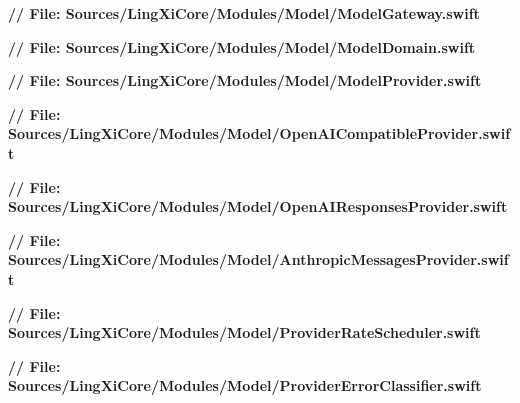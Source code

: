 \documentclass[10pt,a4paper]{article}
\newcommand{\repoRoot}{../../../}
\begin{document}
\noindent\textbf{// File: Sources/LingXiCore/Modules/Model/ModelGateway.swift}\par\vspace{2pt}

\vspace{8pt}

\noindent\textbf{// File: Sources/LingXiCore/Modules/Model/ModelDomain.swift}\par\vspace{2pt}

\vspace{8pt}

\noindent\textbf{// File: Sources/LingXiCore/Modules/Model/ModelProvider.swift}\par\vspace{2pt}

\vspace{8pt}

\noindent\textbf{// File: Sources/LingXiCore/Modules/Model/OpenAICompatibleProvider.swift}\par\vspace{2pt}

\vspace{8pt}

\noindent\textbf{// File: Sources/LingXiCore/Modules/Model/OpenAIResponsesProvider.swift}\par\vspace{2pt}

\vspace{8pt}

\noindent\textbf{// File: Sources/LingXiCore/Modules/Model/AnthropicMessagesProvider.swift}\par\vspace{2pt}

\vspace{8pt}

\noindent\textbf{// File: Sources/LingXiCore/Modules/Model/ProviderRateScheduler.swift}\par\vspace{2pt}

\vspace{8pt}

\noindent\textbf{// File: Sources/LingXiCore/Modules/Model/ProviderErrorClassifier.swift}\par\vspace{2pt}

\vspace{8pt}
\end{document}
